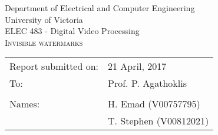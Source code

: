 \begin{titlepage}
  
  \begin{center}
    \begin{LARGE}
      Department of Electrical and Computer Engineering \\
      University of Victoria \\
      ELEC 483 - Digital Video Processing \\[1cm]
      \textsc{Invisible watermarks}
      \\[1in]
    \end{LARGE}
  \end{center}
  
  \begin{tabular}{ p{} p{} } 
    Report submitted on:& 21 April, 2017 \\ 
    To: & Prof. P. Agathoklis \\ 
    & \\
    Names: & H. Emad (V00757795)\\
    & T. Stephen (V00812021)  \\[1in]
  \end{tabular}

\end{titlepage}

